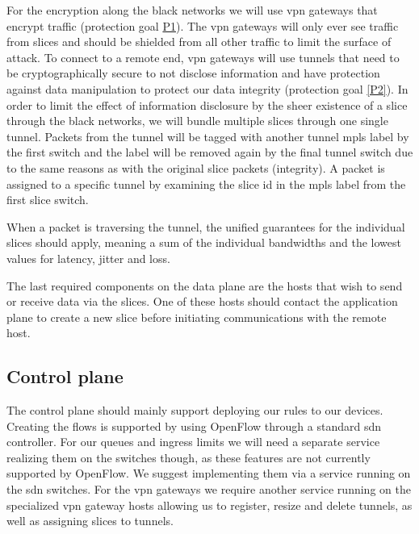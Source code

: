 For the encryption along the black networks we will use \acrshort{vpn} gateways that encrypt traffic (protection goal \hyperref[P1]{P1}). The \acrshort{vpn} gateways will only ever see traffic from slices and should be shielded from all other traffic to limit the surface of attack. To connect to a remote end, \acrshort{vpn} gateways will use tunnels that need to be cryptographically secure to not disclose information and have protection against data manipulation to protect our data integrity (protection goal \ref{P2}). In order to limit the effect of information disclosure by the sheer existence of a slice through the black networks, we will bundle multiple slices through one single tunnel. Packets from the tunnel will be tagged with another tunnel \acrshort{mpls} label by the first switch and the label will be removed again by the final tunnel switch due to the same reasons as with the original slice packets (integrity). A packet is assigned to a specific tunnel by examining the slice id in the \acrshort{mpls} label from the first slice switch.


When a packet is traversing the tunnel, the unified guarantees for the individual slices should apply, meaning a sum of the individual bandwidths and the lowest values for latency, jitter and loss.

The last required components on the data plane are the hosts that wish to send or receive data via the slices. One of these hosts should contact the application plane to create a new slice before initiating communications with the remote host.

\subsection{Control plane}
The control plane should mainly support deploying our rules to our devices. Creating the flows is supported by using OpenFlow through a standard \acrshort{sdn} controller. For our queues and ingress limits we will need a separate service realizing them on the switches though, as these features are not currently supported by OpenFlow. We suggest implementing them via a service running on the \acrshort{sdn} switches. For the \acrshort{vpn} gateways we require another service running on the specialized \acrshort{vpn} gateway hosts allowing us to register, resize and delete tunnels, as well as assigning slices to tunnels.

